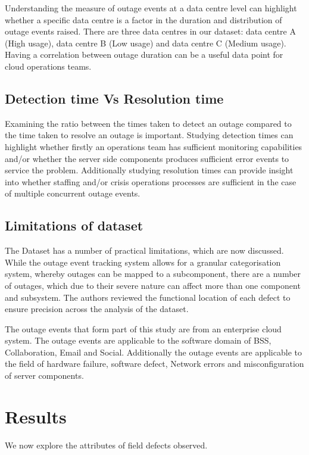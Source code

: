 \documentclass[conference]{IEEEtran}
\begin{document}
Understanding the measure of outage events at a data centre level can highlight whether a specific data centre is a factor in the duration and distribution of outage events raised. There are three data centres in our dataset: data centre A (High usage), data centre B (Low usage) and data centre C (Medium usage). Having a correlation between outage duration can be a useful data point for cloud operations teams.

\subsection{Detection time Vs Resolution time}

Examining the ratio between the times taken to detect an outage compared to the time taken to resolve an outage is important. Studying detection times can highlight whether firstly an operations team has sufficient monitoring capabilities and/or whether the server side components produces sufficient error events to service the problem. Additionally studying resolution times can provide insight into whether staffing and/or crisis operations processes are sufficient in the case of multiple concurrent outage events.

\subsection{Limitations of dataset}

The Dataset has a number of practical limitations, which are now discussed. While the outage event tracking system allows for a granular categorisation system, whereby outages can be mapped to a subcomponent, there are a number of outages, which due to their severe nature can affect more than one component and subsystem. The authors reviewed the functional location of each defect to ensure precision across the analysis of the dataset. \par
The outage events that form part of this study are from an enterprise cloud system. The outage events are applicable to the software domain of BSS, Collaboration, Email and Social. Additionally the outage events are applicable to the field of hardware failure, software defect, Network errors and misconfiguration of server components.

\section{Results}

We now explore the attributes of field defects observed.
\end{document}
